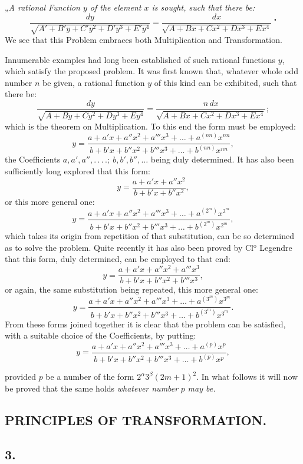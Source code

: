 \documentclass{article}
\begin{document}
„\emph{A rational Function $y$ of the element $x$ is sought, such that there be:}
\[
\frac{dy}{\sqrt{A'+B'y+C'y^{2}+D'y^{3}+E'y^{4}}}=\frac{dx}{\sqrt{A+Bx+Cx^{2}+Dx^{3}+Ex^{4}}}\ \text{"}
\]
We see that this Problem embraces both Multiplication and Transformation.

Innumerable examples had long been established of such rational functions $y$, which satisfy the proposed problem. It was first known that, whatever whole odd number $n$ be given, a rational function $y$ of this kind can be exhibited, such that there be:
\[
\frac{dy}{\sqrt{A+By+Cy^{2}+Dy^{3}+Ey^{4}}}=\frac{n\,dx}{\sqrt{A+Bx+Cx^{2}+Dx^{3}+Ex^{4}}};
\]
which is the theorem on Multiplication. To this end the form must be employed:
\[
y=\frac{a+a'x+a''x^{2}+a'''x^{3}+\ldots+a^{(nn)}x^{nn}}{b+b'x+b''x^{2}+b'''x^{3}+\ldots+b^{(nn)}x^{nn}},
\]
the Coefficients $a, a', a'', .\,.\,.\,.;\ b, b', b'', \ldots$ being duly determined. It has also been sufficiently long explored that this form:
\[
y=\frac{a+a'x+a''x^{2}}{b+b'x+b''x^{2}},
\]
or this more general one:
\[
y=\frac{a+a'x+a''x^{2}+a'''x^{3}+\ldots+a^{(2^{m})}x^{2^{m}}}{b+b'x+b''x^{2}+b'''x^{3}+\ldots+b^{(2^{m})}x^{2^{m}}},
\]
which takes its origin from repetition of that substitution, can be so determined as to solve the problem. Quite recently it has also been proved by Cl$^{\mathrm{o}}$ Legendre that this form, duly determined, can be employed to that end:
\[
y=\frac{a+a'x+a''x^{2}+a'''x^{3}}{b+b'x+b''x^{2}+b'''x^{3}},
\]
or again, the same substitution being repeated, this more general one:
\[
y=\frac{a+a'x+a''x^{2}+a'''x^{3}+\ldots+a^{(3^{m})}x^{3^{m}}}{b+b'x+b''x^{2}+b'''x^{3}+\ldots+b^{(3^{m})}x^{3^{m}}}.
\]
From these forms joined together it is clear that the problem can be satisfied, with a suitable choice of the Coefficients, by putting:
\[
y=\frac{a+a'x+a''x^{2}+a'''x^{3}+\ldots+a^{(p)}x^{p}}{b+b'x+b''x^{2}+b'''x^{3}+\ldots+b^{(p)}x^{p}},
\]

provided $p$ be a number of the form $2^{\alpha}3^{\beta}(2m+1)^{2}$. In what follows it will now be proved that the same holds \emph{whatever number} $p$ \emph{may be.}

\subsection*{PRINCIPLES OF TRANSFORMATION.}

\subsection*{3.}
\end{document}
